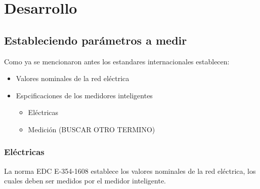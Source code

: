 \chapter{Desarrollo}\label{sec:capitulo3}
\thispagestyle{empty}

\begingroup
{}
\small

\endgroup

\section{Estableciendo parámetros a medir}%
  \par Como ya se mencionaron antes los estandares internacionales establecen:
  \begin{itemize}
   \item Valores nominales de la red eléctrica
   \item Espcificaciones de los medidores inteligentes
         \begin{itemize}
          \item Eléctricas
          \item Medición (BUSCAR OTRO TERMINO)
         \end{itemize}
  \end{itemize}

  \subsection{Eléctricas}
  \par La norma EDC E-354-1608 establece los valores nominales de la red eléctrica,
  los cuales deben ser medidos por el medidor inteligente.

